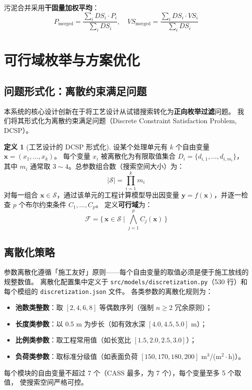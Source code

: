 \documentclass[12pt,a4paper]{ctexart}
\theoremstyle{definition}
\newtheorem{definition}{定义}[section]
\theoremstyle{remark}
\begin{document}
污泥合并采用\textbf{干固量加权平均}：
\[
P_{\text{merged}} = \frac{\sum_i DS_i \cdot P_i}{\sum_i DS_i}, \quad
VS_{\text{merged}} = \frac{\sum_i DS_i \cdot VS_i}{\sum_i DS_i}
\]

\section{可行域枚举与方案优化}\label{sec:enumeration}

\subsection{问题形式化：离散约束满足问题}

本系统的核心设计创新在于将工艺设计从试错搜索转化为\textbf{正向枚举过滤}问题。
我们将其形式化为离散约束满足问题（Discrete Constraint Satisfaction Problem, DCSP）。

\begin{definition}[工艺设计的 DCSP 形式化]
\label{def:dcsp}
设某个处理单元有 $k$ 个自由变量 $\mathbf{x} = (x_1, \ldots, x_k)$。
每个变量 $x_i$ 被离散化为有限取值集合 $D_i = \{d_{i,1}, \ldots, d_{i,m_i}\}$，
其中 $m_i$ 通常取 $3 \sim 4$。总参数组合数（搜索空间大小）为：
\[
|\mathcal{S}| = \prod_{i=1}^k m_i
\]
对每一组合 $\mathbf{x} \in \mathcal{S}$，通过该单元的工程计算模型导出因变量
$\mathbf{y} = f(\mathbf{x})$，并逐一检查 $p$ 个布尔约束条件 $C_1, \ldots, C_p$。
定义\textbf{可行域}为：
\[
\mathcal{F} = \{\, \mathbf{x} \in \mathcal{S} \mid \bigwedge_{j=1}^p C_j(\mathbf{x}) \,\}
\]
\end{definition}

\subsection{离散化策略}

参数离散化遵循「施工友好」原则——每个自由变量的取值必须是便于施工放线的规整数值。
离散化配置集中定义于 \texttt{src/models/discretization.py}（530 行）和每个模组的
\texttt{discretization.json} 文件。
各类参数的离散化规则为：
\begin{itemize}
  \item \textbf{池数类整数}：取 $[2, 4, 6, 8]$ 等偶数序列（强制 $n \ge 2$ 冗余原则）；
  \item \textbf{长度类参数}：以 0.5 m 为步长（如有效水深 $[4.0, 4.5, 5.0]$ m）；
  \item \textbf{比例类参数}：取工程常用值（如长宽比 $[1.5, 2.0, 2.5, 3.0]$）；
  \item \textbf{负荷类参数}：取标准分级值（如表面负荷 $[150, 170, 180, 200]$ m$^3$/(m$^2\cdot$h)）。
\end{itemize}
每个模块的自由变量不超过 7 个（CASS 最多，为 7 个），每个变量至多 5 个取值，
使搜索空间严格可控。
\end{document}
